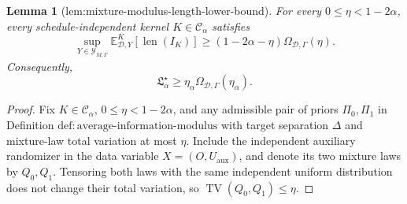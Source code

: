 \documentclass{article}
\newtheorem{lemma}{Lemma}
\begin{document}
\begin{lemma}[lem:mixture-modulus-length-lower-bound]\label{lem:mixture-modulus-length-lower-bound}
For every \(0\le\eta<1-2\alpha\), every schedule-independent kernel \(K\in\mathcal C_\alpha\) satisfies
\[
\sup_{Y\in\mathcal Y_{M,\Gamma}}
\mathbb E^K_{\mathcal D,Y}[\operatorname{len}(I_K)]
\ge (1-2\alpha-\eta)\Omega_{\mathcal D,\Gamma}(\eta).
\]
Consequently,
\[
\mathfrak L_\alpha^\star
\ge \eta_\alpha\Omega_{\mathcal D,\Gamma}(\eta_\alpha).
\]
\end{lemma}
\begin{proof}
Fix \(K\in\mathcal C_\alpha\), \(0\le\eta<1-2\alpha\), and any admissible pair of priors \(\Pi_0,\Pi_1\) in Definition \(\mathrm{def:average\text{-}information\text{-}modulus}\) with target separation \(\Delta\) and mixture-law total variation at most \(\eta\).  Include the independent auxiliary randomizer in the data variable \(X=(O,U_{\mathrm{aux}})\), and denote its two mixture laws by \(Q_0,Q_1\).  Tensoring both laws with the same independent uniform distribution does not change their total variation, so \(\operatorname{TV}(Q_0,Q_1)\le\eta\).


\end{proof}
\end{document}
